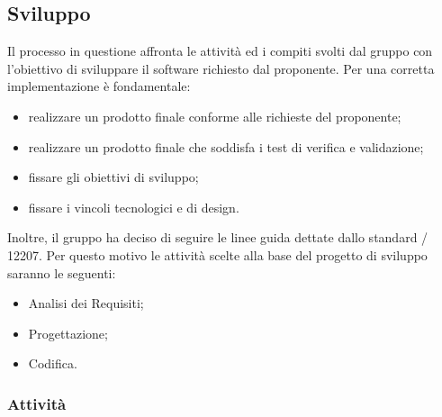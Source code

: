 \subsection{Sviluppo}
Il processo in questione affronta le attività ed i compiti svolti dal gruppo con l'obiettivo di sviluppare il software richiesto dal proponente. Per una corretta implementazione è fondamentale:
\begin{itemize}
		\item realizzare un prodotto finale conforme alle richieste del proponente;
		\item realizzare un prodotto finale che soddisfa i test di verifica e validazione;
		\item fissare gli obiettivi di sviluppo;
		\item fissare i vincoli tecnologici e di design.
\end{itemize}
Inoltre, il gruppo ha deciso di seguire le linee guida dettate dallo standard / 12207. Per questo motivo le attività scelte alla base del progetto di sviluppo saranno le seguenti:
\begin{itemize}
	\item Analisi dei Requisiti;
	\item Progettazione;
	\item Codifica.
\end{itemize}
\subsubsection{Attività}
